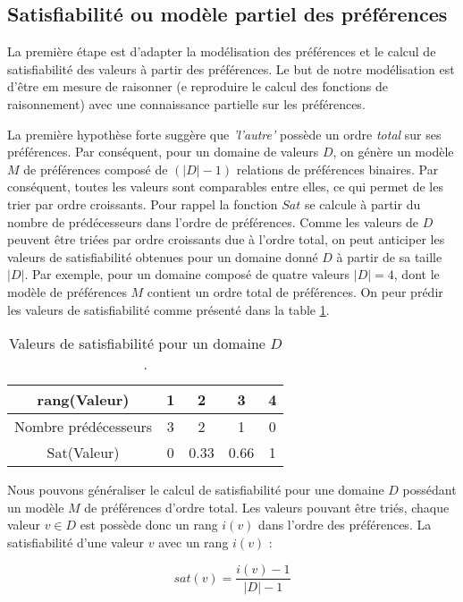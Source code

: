 \documentclass{llncs}
\begin{document}
	
	\subsection{Satisfiabilité ou modèle partiel des préférences}
	\label{sec:sat}
	La première étape est d'adapter la modélisation des préférences et le calcul de satisfiabilité des valeurs à partir des préférences. Le but de notre modélisation est d'être em mesure de raisonner (e reproduire le calcul des fonctions de raisonnement) avec une connaissance partielle sur les préférences. 
	
	La première hypothèse forte suggère que \emph{'l'autre'} possède un ordre \emph{total} sur ses préférences. Par conséquent, pour un domaine de valeurs $D$, on génère un modèle $M$ de préférences composé de $(|D| -1)$ relations de préférences binaires. Par conséquent, toutes les valeurs sont comparables entre elles, ce qui permet de les trier par ordre croissants.
	Pour rappel la fonction $Sat$ se calcule à partir du nombre de prédécesseurs dans l'ordre de préférences. Comme les valeurs de $D$ peuvent être triées par ordre croissants due à l'ordre total, on peut anticiper les valeurs de satisfiabilité obtenues pour un domaine donné $D$ à partir de sa taille $|D|$.
	Par exemple, pour un domaine composé de quatre valeurs $ |D|=4$, dont le modèle de préférences $M$ contient un ordre total de préférences. On peur prédir les valeurs de satisfiabilité comme présenté dans la table \ref{poss}.
	 
	 \begin{table}
	 	\centering
	 	\begin{tabular}{ |c|c|c|c|c| }
		 	\hline				
		 	rang(Valeur) & 1 & 2 & 3 & 4 \\
		 	\hline
		 	Nombre prédécesseurs & 3 & 2 & 1& 0 \\
		 	\hline
		 	Sat(Valeur) & 0 & 0.33 & 0.66 &1 \\
		 	\hline
		 	
	 \end{tabular}
	 \caption{Valeurs de satisfiabilité pour un domaine $D$.}
	 \label{poss}
	 \end{table}
	
	Nous pouvons généraliser le calcul de satisfiabilité pour une domaine $D$ possédant un modèle $M$ de préférences d'ordre total. Les valeurs pouvant être triés, chaque valeur $v \in D$ est possède donc un rang $i(v)$ dans l'ordre des préférences. La satisfiabilité d'une valeur $v$ avec un rang $i(v)$ :
	
	\begin{equation}
		sat(v) = \frac{i(v)-1}{|D|-1}
	\end{equation} 
	
\end{document}
